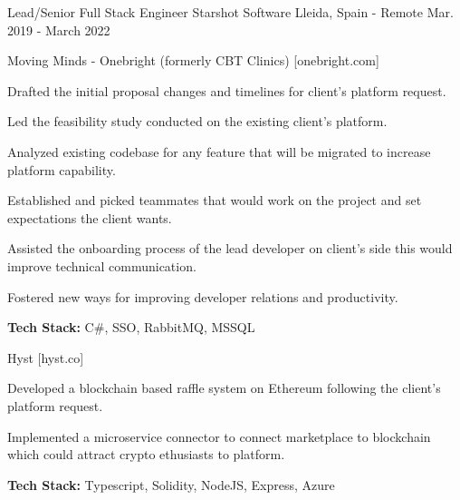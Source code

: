 \begin{cventries}
    \cventry
        {Lead/Senior Full Stack Engineer}
        {Starshot Software}
        {Lleida, Spain - Remote}
        {Mar. 2019 - March 2022}
        {
            \begin{cvitems}
                \item
                    {Moving Minds - Onebright (formerly CBT Clinics) [onebright.com]}
                \begin{cvsubitems}
                    \item
                        {Drafted the initial proposal changes and timelines for client's platform request.}
                    \item 
                        {Led the feasibility study conducted on the existing client's platform.}
                    \item
                        {Analyzed existing codebase for any feature that will be migrated to increase platform capability.}
                    \item
                        {Established and picked teammates that would work on the project and set expectations the client wants.}
                    \item
                        {Assisted the onboarding process of the lead developer on client’s side this would improve technical communication.}
                    \item 
                        {Fostered new ways for improving developer relations and productivity.}
                    \item 
                        {\textbf{Tech Stack:} C\#, SSO, RabbitMQ, MSSQL}
                \end{cvsubitems}
                \item
                    {Hyst [hyst.co]}
                \begin{cvsubitems}
                    \item 
                        {Developed a blockchain based raffle system on Ethereum following the client's platform request.}
                    \item 
                        {Implemented a microservice connector to connect marketplace to blockchain which could attract crypto ethusiasts to platform.}
                    \item 
                        {\textbf{Tech Stack:} Typescript, Solidity, NodeJS, Express, Azure}
                \end{cvsubitems}

\end{cvitems}}
\end{cventries}
